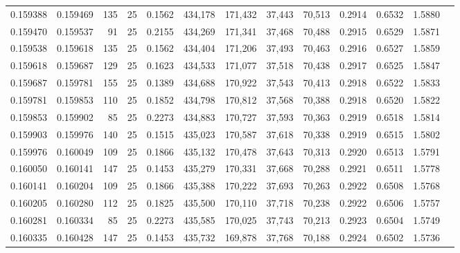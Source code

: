 \begin{tabular}{rrrrrrrrrrrrr}
0.159388 & 0.159469 &   135 &  25 &                                     0.1562 & 434,178 & 171,432 &  37,443 &  70,513 & 0.2914 & 0.6532 & 1.5880 \\
0.159470 & 0.159537 &    91 &  25 &                                     0.2155 & 434,269 & 171,341 &  37,468 &  70,488 & 0.2915 & 0.6529 & 1.5871 \\
0.159538 & 0.159618 &   135 &  25 &                                     0.1562 & 434,404 & 171,206 &  37,493 &  70,463 & 0.2916 & 0.6527 & 1.5859 \\
0.159618 & 0.159687 &   129 &  25 &                                     0.1623 & 434,533 & 171,077 &  37,518 &  70,438 & 0.2917 & 0.6525 & 1.5847 \\
0.159687 & 0.159781 &   155 &  25 &                                     0.1389 & 434,688 & 170,922 &  37,543 &  70,413 & 0.2918 & 0.6522 & 1.5833 \\
0.159781 & 0.159853 &   110 &  25 &                                     0.1852 & 434,798 & 170,812 &  37,568 &  70,388 & 0.2918 & 0.6520 & 1.5822 \\
0.159853 & 0.159902 &    85 &  25 &                                     0.2273 & 434,883 & 170,727 &  37,593 &  70,363 & 0.2919 & 0.6518 & 1.5814 \\
0.159903 & 0.159976 &   140 &  25 &                                     0.1515 & 435,023 & 170,587 &  37,618 &  70,338 & 0.2919 & 0.6515 & 1.5802 \\
0.159976 & 0.160049 &   109 &  25 &                                     0.1866 & 435,132 & 170,478 &  37,643 &  70,313 & 0.2920 & 0.6513 & 1.5791 \\
0.160050 & 0.160141 &   147 &  25 &                                     0.1453 & 435,279 & 170,331 &  37,668 &  70,288 & 0.2921 & 0.6511 & 1.5778 \\
0.160141 & 0.160204 &   109 &  25 &                                     0.1866 & 435,388 & 170,222 &  37,693 &  70,263 & 0.2922 & 0.6508 & 1.5768 \\
0.160205 & 0.160280 &   112 &  25 &                                     0.1825 & 435,500 & 170,110 &  37,718 &  70,238 & 0.2922 & 0.6506 & 1.5757 \\
0.160281 & 0.160334 &    85 &  25 &                                     0.2273 & 435,585 & 170,025 &  37,743 &  70,213 & 0.2923 & 0.6504 & 1.5749 \\
0.160335 & 0.160428 &   147 &  25 &                                     0.1453 & 435,732 & 169,878 &  37,768 &  70,188 & 0.2924 & 0.6502 & 1.5736 \\

\end{tabular}
